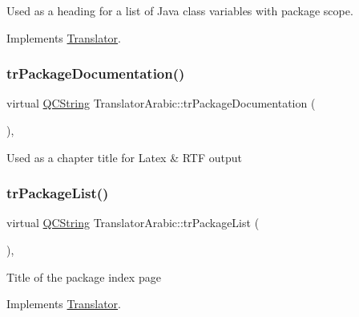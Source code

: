 Used as a heading for a list of Java class variables with package scope. 

Implements \mbox{\hyperlink{class_translator}{Translator}}.

\mbox{\label{class_translator_arabic_a06b71185bea0e8511121b5274d5e45be}} 
\subsubsection{\texorpdfstring{trPackageDocumentation()}{trPackageDocumentation()}}
{\footnotesize\ttfamily virtual \mbox{\hyperlink{class_q_c_string}{Q\+C\+String}} Translator\+Arabic\+::tr\+Package\+Documentation (\begin{DoxyParamCaption}{ }\end{DoxyParamCaption})\hspace{0.3cm}{\ttfamily [inline]}, {\ttfamily [virtual]}}

Used as a chapter title for Latex \& R\+TF output \mbox{\label{class_translator_arabic_a265f6f48fad089ea092ab98682e0d842}} 
\subsubsection{\texorpdfstring{trPackageList()}{trPackageList()}}
{\footnotesize\ttfamily virtual \mbox{\hyperlink{class_q_c_string}{Q\+C\+String}} Translator\+Arabic\+::tr\+Package\+List (\begin{DoxyParamCaption}{ }\end{DoxyParamCaption})\hspace{0.3cm}{\ttfamily [inline]}, {\ttfamily [virtual]}}

Title of the package index page 

Implements \mbox{\hyperlink{class_translator}{Translator}}.

\mbox{\label{class_translator_arabic_ab1192d198f1a4bd72319034848f9bb08}} 
